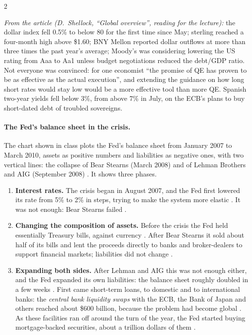 \begin{paracol}{2}
\begin{casestudy}
\smallskip
\emph{From the article (D.~Shellock, ``Global overview'', reading for the lecture):} the dollar index fell 0.5\% to below 80 for the first time since May; sterling reached a four-month high
above \$1.60; BNY Mellon reported dollar outflows at more than three times the past year's average; Moody's was considering lowering the US rating from Aaa to Aa1 unless budget
negotiations reduced the debt/GDP ratio. Not everyone was convinced: for one economist ``the promise of QE has proven to be as effective as the actual execution'', and extending the
guidance on how long short rates would stay low would be a more effective tool than more QE. Spanish two-year yields fell below 3\%, from above 7\% in July, on the ECB's plans to buy
short-dated debt of troubled sovereigns.
\end{casestudy}

\paragraph{The Fed's balance sheet in the crisis.} The chart shown in class plots the Fed's balance sheet from January 2007 to
March 2010, assets as positive numbers and liabilities as negative ones, with two vertical lines: the collapse of Bear Stearns
(March 2008) and of Lehman Brothers and AIG (September 2008) . It shows three phases.
\begin{enumerate}
  \item \textbf{Interest rates.} The crisis began in August 2007, and the Fed first lowered its rate from 5\% to 2\% in steps,
        trying to make the system more elastic . It was not enough: Bear Stearns failed .
  \item \textbf{Changing the composition of assets.} Before the crisis the Fed held essentially Treasury bills, against currency
        . After Bear Stearns it sold about half of its bills and lent the proceeds directly to banks and
        broker-dealers to support financial markets; liabilities did not change .
  \item \textbf{Expanding both sides.} After Lehman and AIG this was not enough either, and the Fed expanded its own liabilities:
        the balance sheet roughly doubled in a few weeks . First came short-term loans, to domestic
        and to international banks: the \emph{central bank liquidity swaps} with the ECB, the Bank of Japan and others reached
        about \$600 billion, because the problem had become global . As these facilities ran off
        around the turn of the year, the Fed started buying mortgage-backed securities, about a trillion dollars of them
        .
\end{enumerate}


\end{paracol}
